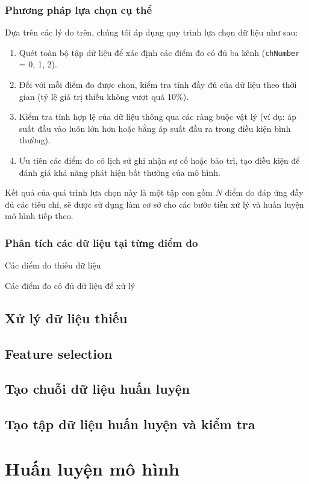 \subsubsection{Phương pháp lựa chọn cụ thể}
Dựa trên các lý do trên, chúng tôi áp dụng quy trình lựa chọn dữ liệu như sau:

\begin{enumerate}
    \item Quét toàn bộ tập dữ liệu để xác định các điểm đo có đủ ba kênh (\texttt{chNumber} = 0, 1, 2).
    \item Đối với mỗi điểm đo được chọn, kiểm tra tính đầy đủ của dữ liệu theo thời gian (tỷ lệ giá trị thiếu không vượt quá 10\%).
    \item Kiểm tra tính hợp lệ của dữ liệu thông qua các ràng buộc vật lý (ví dụ: áp suất đầu vào luôn lớn hơn hoặc bằng áp suất đầu ra trong điều kiện bình thường).
    \item Ưu tiên các điểm đo có lịch sử ghi nhận sự cố hoặc bảo trì, tạo điều kiện để đánh giá khả năng phát hiện bất thường của mô hình.
\end{enumerate}

Kết quả của quá trình lựa chọn này là một tập con gồm $N$ điểm đo đáp ứng đầy đủ các tiêu chí, sẽ được sử dụng làm cơ sở cho các bước tiền xử lý và huấn luyện mô hình tiếp theo.
\subsubsection{Phân tích các dữ liệu tại từng điểm đo}
Các điểm đo thiếu dữ liệu

Các điểm đo có đủ dữ liệu để xử lý


\subsection{Xử lý dữ liệu thiếu}
\subsection{Feature selection}
\subsection{Tạo chuỗi dữ liệu huấn luyện}
\subsection{Tạo tập dữ liệu huấn luyện và kiểm tra}

\section{Huấn luyện mô hình}
